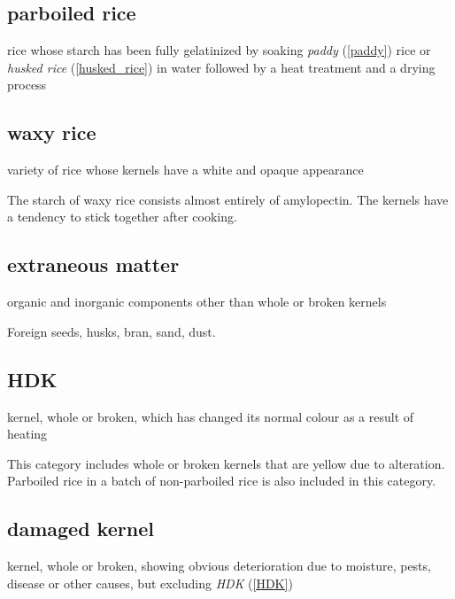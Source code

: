 \subsection*{parboiled rice}

rice whose starch has been fully gelatinized by soaking \textit{paddy} (\ref{paddy}) rice or \textit{husked rice} (\ref{husked_rice}) in water followed by a heat treatment and a drying process

\subsection*{waxy rice}
variety of rice whose kernels have a white and opaque appearance

\begin{note}
  The starch of waxy rice consists almost entirely of amylopectin. The kernels have a tendency to stick together after cooking.
\end{note}

\subsection*{extraneous matter}

organic and inorganic components other than whole or broken kernels

\begin{example}
  Foreign seeds, husks, bran, sand, dust.
\end{example}

\subsection*{HDK}
\label{HDK}

kernel, whole or broken, which has changed its normal colour as a result of heating

\begin{note}
  This category includes whole or broken kernels that are yellow due to alteration. Parboiled rice in a batch of non-parboiled rice is also included in this category.
\end{note}

\subsection*{damaged kernel}
kernel, whole or broken, showing obvious deterioration due to moisture, pests, disease or other causes, but excluding \textit{HDK} (\ref{HDK})

